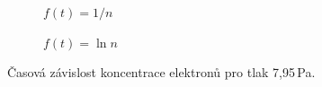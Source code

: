 \documentclass[a4paper,12pt]{article}
\begin{document}
\begin{figure}[h]
	\centering
	\begin{subfigure}[b]{.49\linewidth}
		\centering
		\caption{$f(t) = 1/n$}
	\end{subfigure}
	\begin{subfigure}[b]{.49\linewidth}
		\centering
		\caption{$f(t) = \ln n$}
	\end{subfigure}
	\caption{Časová závislost koncentrace elektronů pro tlak 7,95\,Pa.}
	\label{g:5Pa}
\end{figure}
\end{document}
